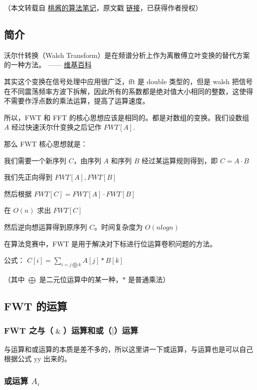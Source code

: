 
（本文转载自 \href{https://zhuanlan.zhihu.com/c_1005817911142838272}{桃酱的算法笔记}，原文戳 \href{https://zhuanlan.zhihu.com/p/41867199}{链接}，已获得作者授权）

\subsection{简介}

\begin{QUOTE}{}{}
沃尔什转换（Walsh Transform）是在频谱分析上作为离散傅立叶变换的替代方案的一种方法。 —— \href{https://zh.wikipedia.org/zh-cn/%E6%B2%83%E7%88%BE%E4%BB%80%E8%BD%89%E6%8F%9B}{维基百科}
\end{QUOTE}

其实这个变换在信号处理中应用很广泛，fft 是 double 类型的，但是 walsh 把信号在不同震荡频率方波下拆解，因此所有的系数都是绝对值大小相同的整数，这使得不需要作浮点数的乘法运算，提高了运算速度。

所以，FWT 和 FFT 的核心思想应该是相同的。都是对数组的变换。我们设数组 $A$ 经过快速沃尔什变换之后记作 $FWT[A]$.

那么 FWT 核心思想就是：

我们需要一个新序列 $C$，由序列 $A$ 和序列 $B$ 经过某运算规则得到，即 $C = A \cdot B$

我们先正向得到 $FWT[A], FWT[B]$

然后根据 $FWT[C]=FWT[A] \cdot FWT[B]$

在 $O(n)$ 求出 $FWT[C]$

然后逆向想运算得到原序列 $C$。时间复杂度为 $O(nlogn)$

在算法竞赛中，FWT 是用于解决对下标进行位运算卷积问题的方法。

公式： $C[i] = \sum_{i=j \bigoplus k}A[j] * B[k]$

（其中 $\bigoplus$ 是二元位运算中的某一种，$*$ 是普通乘法）

\subsection{FWT 的运算}

\subsubsection{FWT 之与（$\And$）运算和或（$|$）运算}

与运算和或运算的本质是差不多的，所以这里讲一下或运算，与运算也是可以自己根据公式 yy 出来的。

\subsubsection{或运算 $A_i$}

